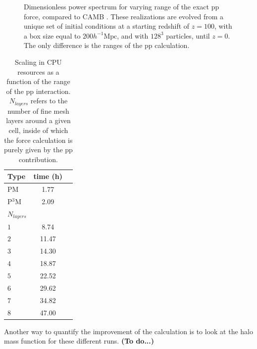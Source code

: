\begin{figure}
  \begin{center}
  \caption{ Dimensionless power spectrum for varying range of the exact pp force, compared to  {\small CAMB} \citep{Lewis:1999bs}.
  These realizations are evolved from a unique set of initial conditions at a starting redshift of $z = 100$, with a box size equal to $ 200 h^{-1}\mbox{Mpc}$,
 and with $128^{3}$ particles, until $z=0$. The only difference is the ranges of the pp calculation.}
    \label{fig:power}
  \end{center}
\end{figure}


\begin{table}
\begin{center}
\caption{Scaling in {\small CPU} resources as a function of the range of the pp interaction.
$N_{layers}$ refers to the number of fine mesh layers around a given cell, inside of which the force calculation
is purely given by the pp contribution. }
\begin{tabular}{|l|c|c|}
\hline 
             Type         & time (h)   \\
                  \hline
PM                         & 1.77 \\
P$^{3}$M             & 2.09 \\
\hline
$N_{layers}$       &          \\
\hline
 $1$ & 8.74 \\
 $2$ & 11.47\\
 $3$ & 14.30 \\
 $4$ & 18.87\\
 $5$ & 22.52\\
 $6$ & 29.62\\
 $7$ & 34.82\\
 $8$ & 47.00\\
 

\hline \hline
\end{tabular}
\label{table:cpu_pp_ext}
\end{center}
\end{table}

Another way to quantify the improvement of the calculation is to look at the halo mass function for these different runs.
{\bf (To do...)}
